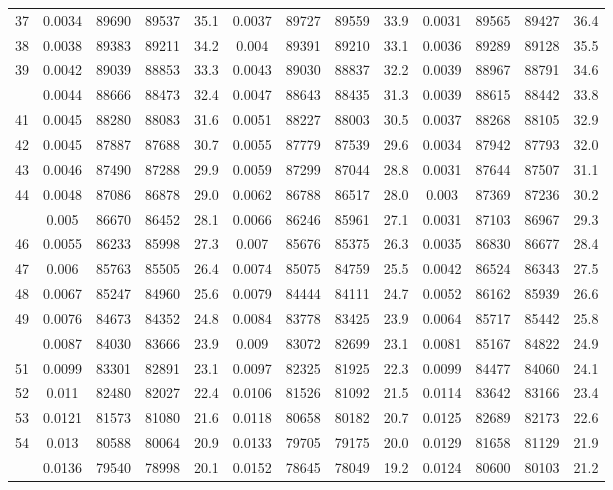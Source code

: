\documentclass[
  14pt,
]{article}
\begin{document}
\begin{longtable}[t]{lcccccccccccc}
37 & 0.0034 & 89690 & 89537 & 35.1 & 0.0037 & 89727 & 89559 & 33.9 & 0.0031 & 89565 & 89427 & 36.4\\
38 & 0.0038 & 89383 & 89211 & 34.2 & 0.004 & 89391 & 89210 & 33.1 & 0.0036 & 89289 & 89128 & 35.5\\
39 & 0.0042 & 89039 & 88853 & 33.3 & 0.0043 & 89030 & 88837 & 32.2 & 0.0039 & 88967 & 88791 & 34.6\\
\addlinespace
40 & 0.0044 & 88666 & 88473 & 32.4 & 0.0047 & 88643 & 88435 & 31.3 & 0.0039 & 88615 & 88442 & 33.8\\
41 & 0.0045 & 88280 & 88083 & 31.6 & 0.0051 & 88227 & 88003 & 30.5 & 0.0037 & 88268 & 88105 & 32.9\\
42 & 0.0045 & 87887 & 87688 & 30.7 & 0.0055 & 87779 & 87539 & 29.6 & 0.0034 & 87942 & 87793 & 32.0\\
43 & 0.0046 & 87490 & 87288 & 29.9 & 0.0059 & 87299 & 87044 & 28.8 & 0.0031 & 87644 & 87507 & 31.1\\
44 & 0.0048 & 87086 & 86878 & 29.0 & 0.0062 & 86788 & 86517 & 28.0 & 0.003 & 87369 & 87236 & 30.2\\
\addlinespace
45 & 0.005 & 86670 & 86452 & 28.1 & 0.0066 & 86246 & 85961 & 27.1 & 0.0031 & 87103 & 86967 & 29.3\\
46 & 0.0055 & 86233 & 85998 & 27.3 & 0.007 & 85676 & 85375 & 26.3 & 0.0035 & 86830 & 86677 & 28.4\\
47 & 0.006 & 85763 & 85505 & 26.4 & 0.0074 & 85075 & 84759 & 25.5 & 0.0042 & 86524 & 86343 & 27.5\\
48 & 0.0067 & 85247 & 84960 & 25.6 & 0.0079 & 84444 & 84111 & 24.7 & 0.0052 & 86162 & 85939 & 26.6\\
49 & 0.0076 & 84673 & 84352 & 24.8 & 0.0084 & 83778 & 83425 & 23.9 & 0.0064 & 85717 & 85442 & 25.8\\
\addlinespace
50 & 0.0087 & 84030 & 83666 & 23.9 & 0.009 & 83072 & 82699 & 23.1 & 0.0081 & 85167 & 84822 & 24.9\\
51 & 0.0099 & 83301 & 82891 & 23.1 & 0.0097 & 82325 & 81925 & 22.3 & 0.0099 & 84477 & 84060 & 24.1\\
52 & 0.011 & 82480 & 82027 & 22.4 & 0.0106 & 81526 & 81092 & 21.5 & 0.0114 & 83642 & 83166 & 23.4\\
53 & 0.0121 & 81573 & 81080 & 21.6 & 0.0118 & 80658 & 80182 & 20.7 & 0.0125 & 82689 & 82173 & 22.6\\
54 & 0.013 & 80588 & 80064 & 20.9 & 0.0133 & 79705 & 79175 & 20.0 & 0.0129 & 81658 & 81129 & 21.9\\
\addlinespace
55 & 0.0136 & 79540 & 78998 & 20.1 & 0.0152 & 78645 & 78049 & 19.2 & 0.0124 & 80600 & 80103 & 21.2\\

\end{longtable}
\end{document}
